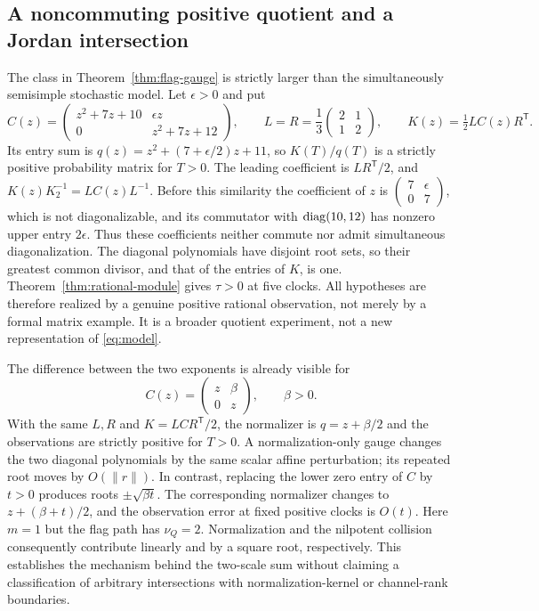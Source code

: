 \subsection{A noncommuting positive quotient and a Jordan intersection}
The class in Theorem~\ref{thm:flag-gauge} is strictly larger than the
simultaneously semisimple stochastic model. Let $\epsilon>0$ and put
\[
 C(z)=\begin{pmatrix}z^2+7z+10&\epsilon z\\0&z^2+7z+12\end{pmatrix},
 \qquad L=R=\frac13\begin{pmatrix}2&1\\1&2\end{pmatrix},
 \qquad K(z)=\tfrac12LC(z)R^{\mathsf T}.
\]
Its entry sum is $q(z)=z^2+(7+\epsilon/2)z+11$, so $K(T)/q(T)$ is a
strictly positive probability matrix for $T>0$. The leading coefficient
is $LR^{\mathsf T}/2$, and $K(z)K_2^{-1}=LC(z)L^{-1}$. Before this
similarity the coefficient of $z$ is
$\left(\begin{smallmatrix}7&\epsilon\\0&7\end{smallmatrix}\right)$,
which is not diagonalizable, and its commutator with
$\operatorname{diag}(10,12)$ has nonzero upper entry $2\epsilon$. Thus these
coefficients neither commute nor admit simultaneous diagonalization.
The diagonal polynomials have disjoint root sets, so their greatest
common divisor, and that of the entries of $K$, is one.
Theorem~\ref{thm:rational-module} gives $\tau>0$ at five clocks.
All hypotheses are therefore realized by a genuine positive rational
observation, not merely by a formal matrix example. It is a broader
quotient experiment, not a new representation of \eqref{eq:model}.

The difference between the two exponents is already visible for
\[
 C(z)=\begin{pmatrix}z&\beta\\0&z\end{pmatrix},\qquad \beta>0.
\]
With the same $L,R$ and $K=LC R^{\mathsf T}/2$, the normalizer is
$q=z+\beta/2$ and the observations are strictly positive for $T>0$.
A normalization-only gauge changes the two diagonal polynomials by
the same scalar affine perturbation; its repeated root moves by
$O(\|r\|)$. In contrast, replacing the lower zero entry of $C$ by
$t>0$ produces roots $\pm\sqrt{\beta t}$. The corresponding normalizer
changes to $z+(\beta+t)/2$, and the observation error at fixed positive
clocks is $O(t)$. Here $m=1$ but the flag path has $\nu_Q=2$.
Normalization and the nilpotent collision consequently contribute
linearly and by a square root, respectively. This establishes the
mechanism behind the two-scale sum without claiming a classification
of arbitrary intersections with normalization-kernel or channel-rank
boundaries.
